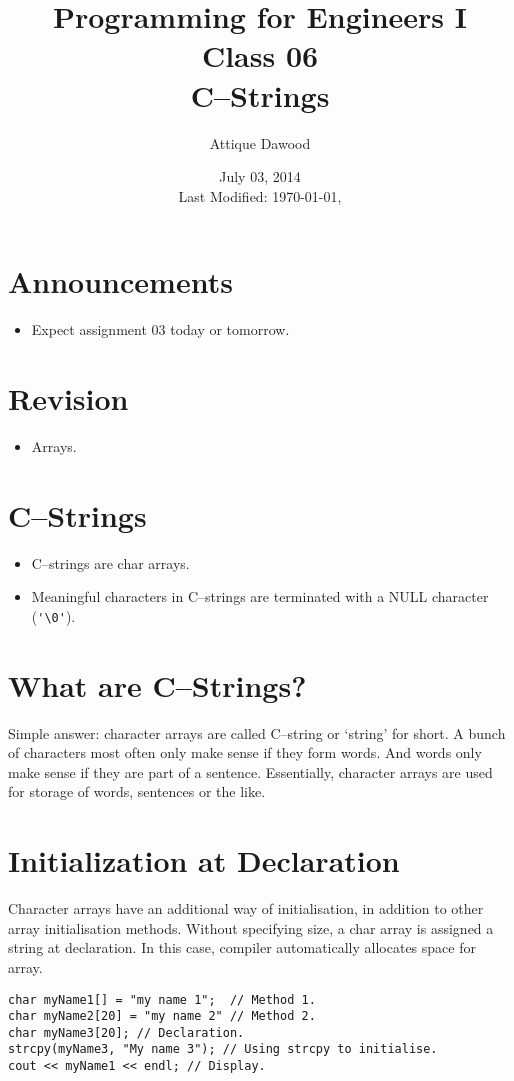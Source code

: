 \documentclass[12pt,a4paper]{article}
\title{Programming for Engineers I\\Class 06\\C--Strings}
\author{Attique Dawood}
\date{July 03, 2014\\[0.2cm] Last Modified: \today, \currenttime}
\begin{document}
\maketitle
\section{Announcements}
\begin{itemize}
\item Expect assignment 03 today or tomorrow.
\end{itemize}
\section{Revision}
\begin{itemize}
\item Arrays.
\end{itemize}
\section{C--Strings}
\begin{itemize}
\item C--strings are char arrays.
\item Meaningful characters in C--strings are terminated with a NULL character (\verb|'\0'|).
\end{itemize}
\section{What are C--Strings?}
Simple answer: character arrays are called C--string or `string' for short. A bunch of characters most often only make sense if they form words. And words only make sense if they are part of a sentence. Essentially, character arrays are used for storage of words, sentences or the like.
\section{Initialization at Declaration}
Character arrays have an additional way of initialisation, in addition to other array initialisation methods. Without specifying size, a char array is assigned a string at declaration. In this case, compiler automatically allocates space for array.
\begin{lstlisting}[caption={Initialisation of C--Strings}]
char myName1[] = "my name 1";  // Method 1.
char myName2[20] = "my name 2" // Method 2.
char myName3[20]; // Declaration.
strcpy(myName3, "My name 3"); // Using strcpy to initialise.
cout << myName1 << endl; // Display.
\end{lstlisting}
\end{document}

